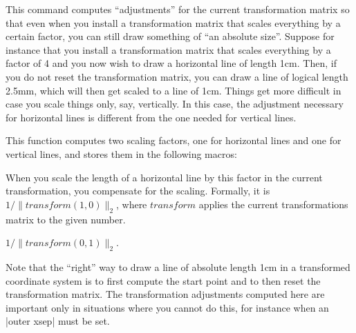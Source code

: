 \begin{command}{\pgftransformationadjustments}
    This command computes ``adjustments'' for the current transformation matrix
    so that even when you install a transformation matrix that scales
    everything by a certain factor, you can still draw something of ``an
    absolute size''. Suppose for instance that you install a transformation
    matrix that scales everything by a factor of 4 and you now wish to draw a
    horizontal line of length 1cm. Then, if you do not reset the transformation
    matrix, you can draw a line of logical length 2.5mm, which will then get
    scaled to a line of 1cm. Things get more difficult in case you scale things
    only, say, vertically. In this case, the adjustment necessary for
    horizontal lines is different from the one needed for vertical lines.

    This function computes two scaling factors, one for horizontal lines
    and one for vertical lines, and stores them in the following macros:
    \begin{command}{\pgfhorizontaltransformationadjustment}
        When you scale the length of a horizontal line by this factor in the
        current transformation, you compensate for the scaling. Formally, it is
        $1/\|\mathit{transform}(1,0)\|_2$, where $\mathit{transform}$ applies
        the current transformations matrix to the given number.
\begin{codeexample}[]
\end{codeexample}
\begin{codeexample}[]
\end{codeexample}
    \end{command}
    \begin{command}{\pgfverticaltransformationadjustment}
        $1/\|\mathit{transform}(0,1)\|_2$.
    \end{command}

    Note that the ``right'' way to draw a line of absolute length 1cm in a
    transformed coordinate system is to first compute the start point and to
    then reset the transformation matrix. The transformation adjustments
    computed here are important only in situations where you cannot do this,
    for instance when an |outer xsep| must be set.
\end{command}


